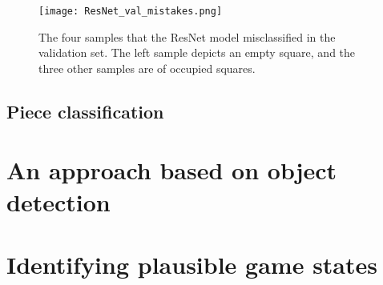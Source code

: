 \documentclass[../main.tex]{subfiles}
\begin{document}
\begin{figure}
    \texttt{[image: ResNet\_val\_mistakes.png]}
    \caption[The four samples that the ResNet model misclassified in the validation set.]{The four samples that the ResNet model misclassified in the validation set. The left sample depicts an empty square, and the three other samples are of occupied squares.}
    \label{fig:occupancy_resnet_mistakes}
\end{figure}

\subsection{Piece classification}

\section{An approach based on object detection}
\section{Identifying plausible game states}
\end{document}
